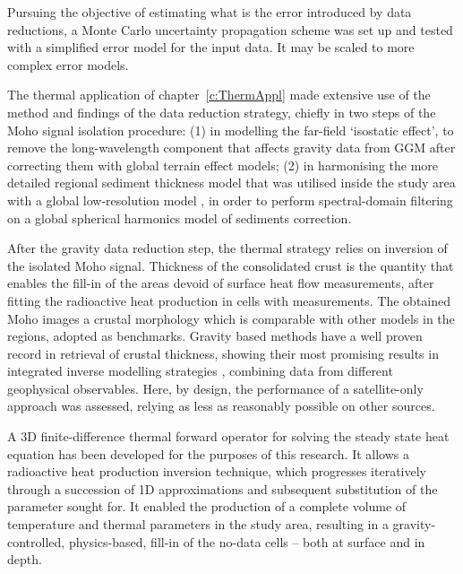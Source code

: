 Pursuing the objective of estimating what is the error introduced by data reductions, a Monte Carlo uncertainty propagation scheme was set up and tested with a simplified error model for the input data.
It may be scaled to more complex error models.

The thermal application of chapter~\ref{c:ThermAppl} made extensive use of the method and findings of the data reduction strategy, chiefly in two steps of the Moho signal isolation procedure:
(1) in modelling the far-field `isostatic effect', to remove the long-wavelength component that affects gravity data from GGM after correcting them with global terrain effect models; (2) in harmonising the more detailed regional sediment thickness model that was utilised inside the study area \parencite[{EuCRUST},][]{Tesauro2008} with a global low-resolution model \parencite[{LITHO1.0},][]{Pasyanos2014}, in order to perform spectral-domain filtering on a global spherical harmonics model of sediments correction.

After the gravity data reduction step, the thermal strategy relies on inversion of the isolated Moho signal.
Thickness of the consolidated crust is the quantity that enables the fill-in of the areas devoid of surface heat flow measurements, after fitting the radioactive heat production in cells with measurements.
The obtained Moho images a crustal morphology which is comparable with other models in the regions, adopted as benchmarks.
Gravity based methods have a well proven record in retrieval of crustal thickness, showing their most promising results in integrated inverse modelling strategies \parencites[e.g.][]{Eshagh2011}{Reguzzoni2015}, combining data from different geophysical observables.
Here, by design, the performance of a satellite-only approach was assessed, relying as less as reasonably possible on other sources.

A 3D finite-difference thermal forward operator for solving the steady state heat equation has been developed for the purposes of this research.
It allows a radioactive heat production inversion technique, which progresses iteratively through a succession of 1D approximations and subsequent substitution of the parameter sought for.
It enabled the production of a complete volume of temperature and thermal parameters in the study area, resulting in a gravity-controlled, physics-based, fill-in of the no-data cells -- both at surface and in depth.
\\

